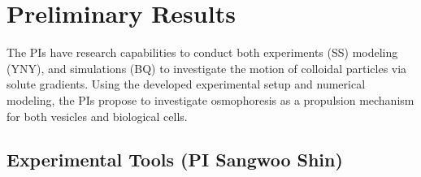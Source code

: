\documentclass[11pt]{article}
\begin{document}
\section{Preliminary Results\label{sec:preliminary_results}} The PIs
have research capabilities to conduct both experiments (SS) modeling
(YNY), and simulations (BQ) to investigate the motion of colloidal
particles via solute gradients.  Using the developed experimental setup
and numerical modeling, the PIs propose to investigate osmophoresis as a
propulsion mechanism for both vesicles and biological cells. 

\subsection{Experimental Tools (PI Sangwoo Shin)}
\label{subsection:exp_tools}
\end{document}
